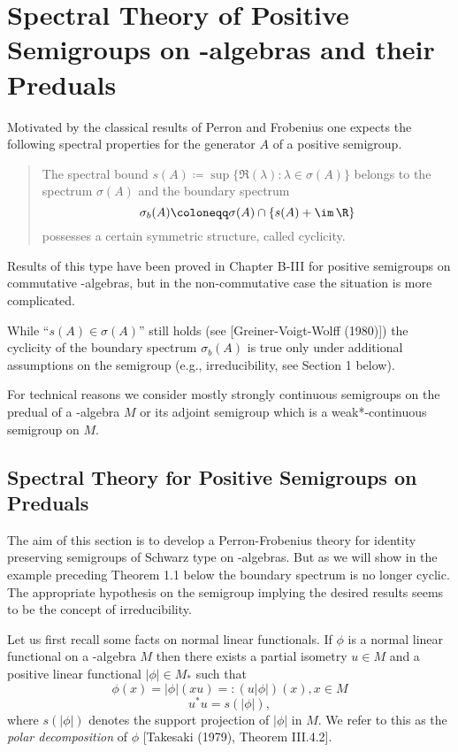 \setcounter{chapter}{2}		%
\setcounter{section}{1}		%
\chapter{Spectral Theory of Positive Semigroups on \WA-algebras and their Preduals}\label{chap:D-III}
Motivated by the classical results of Perron and Frobenius one expects the following spectral properties for the generator $A$ of a positive semigroup.
\begin{quote}
The spectral bound 
$s(A) \coloneqq \sup\{\Re(\lambda) \colon \lambda \in \sigma(A)\}$ belongs to the spectrum $\sigma(A)$ and the boundary spectrum
\[
\sigma_{b}(A) \coloneqq \sigma(A) \cap \{s(A)+\im\,\R\}
\]
possesses a certain symmetric structure, called cyclicity.
\end{quote}
Results of this type have been proved in Chapter B-III for positive semigroups on commutative \CA-algebras, but in the non-commutative case the situation is more complicated.

While \enquote{$s(A) \in \sigma(A)$} still holds (see [Greiner-Voigt-Wolff (1980)]) the cyclicity of the boundary spectrum $\sigma_{b}(A)$ is true only under additional assumptions on the semigroup (e.g., irreducibility, see Section 1 below).

For technical reasons we consider mostly strongly continuous semigroups on the predual of a \WA-algebra $M$ or its adjoint semigroup which is a weak*-continuous semigroup on $M$.
\section{Spectral Theory for Positive Semigroups on Preduals}\label{sec:d3-1}
The aim of this section is to develop a Perron-Frobenius theory for identity preserving semigroups of Schwarz type on \WA-algebras.
But as we will show in the example preceding Theorem 1.1 below the boundary spectrum is no longer cyclic.
The appropriate hypothesis on the semigroup implying the desired results seems to be the concept of irreducibility.

\pagebreak

Let us first recall some facts on normal linear functionals.
If $\phi$ is a normal linear functional on a \WA-algebra $M$ then there exists a partial isometry $u\in M$ and a positive linear functional $|\phi|\in M_{*}$ such that
\[
	\phi(x) = |\phi|(xu) =: (u|\phi|)(x), x\in M
\]
\[
	u^{*}u = s(|\phi|),
\]
where $s(|\phi|)$ denotes the support projection of $|\phi|$ in $M$.
We refer to this as the \emph{polar decomposition} of $\phi$ [Takesaki (1979), Theorem III.4.2].

